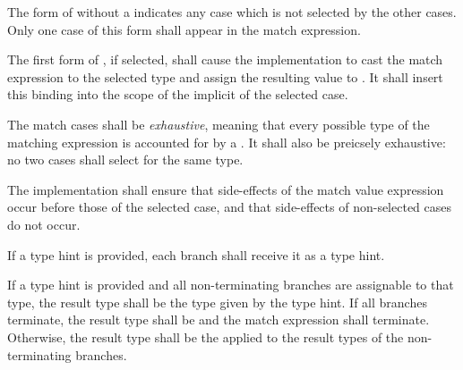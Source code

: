 

\specsubsubitem
The form of  without a  indicates any
case which is not selected by the other cases. Only one case of this form shall
appear in the match expression.

\specsubsubitem
The first form of , if selected, shall cause the
implementation to cast the match expression to the selected type and assign the
resulting value to . It shall insert this binding into the
scope of the implicit  of the selected case.

\specsubsubitem
The match cases shall be \textit{exhaustive}, meaning that every possible type
of the matching expression is accounted for by a . It
shall also be preicsely exhaustive: no two cases shall select for the same
type.

\specsubsubitem
The implementation shall ensure that side-effects of the match value
expression occur before those of the selected case, and that side-effects of
non-selected cases do not occur.

\specsubsubitem
If a type hint is provided, each branch shall receive it as a type hint.

\specsubsubitem
If a type hint is provided and all non-terminating branches are assignable to
that type, the result type shall be the type given by the type hint. If all
branches terminate, the result type shall be  and the match
expression shall terminate. Otherwise, the result type shall be the
 applied to the result types of the
non-terminating branches.



\begin{grammar}
 \\
	   \\
	\terminal{*}    \\
	 \terminal{=}  \\

 \oneof \\
	\terminal{=}
	\terminal{+=}
	\terminal{-=}
	\terminal{*=}
	\terminal{/=}
	\terminal{\%=}
	\terminal{\textless{}\textless{}=}
	\terminal{\textgreater{}\textgreater{}=}
	\terminal{\&=}
	\terminal{|=}
	\terminal{\textasciicircum=}
	\terminal{\&\&=}
	\terminal{||=}
	\terminal{\textasciicircum\textasciicircum=}
\end{grammar}

